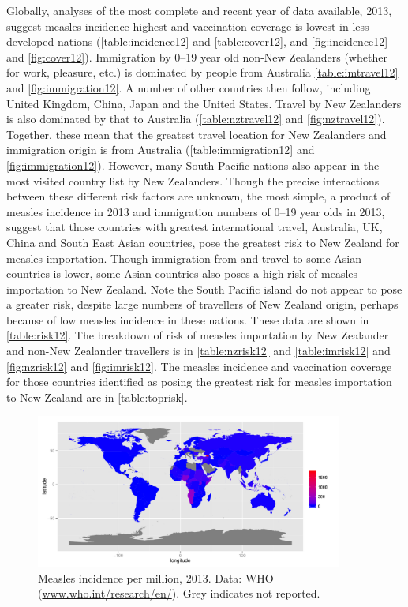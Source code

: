 \documentclass{article}
\begin{document}
Globally, analyses of the most complete and recent year of data available, 2013, suggest measles incidence highest  and vaccination coverage is lowest in less developed nations (\autoref{table:incidence12} and \autoref{table:cover12}, and \autoref{fig:incidence12} and \autoref{fig:cover12}). Immigration by 0--19 year old non-New Zealanders (whether for work, pleasure, etc.) is dominated by people from Australia \autoref{table:imtravel12} and \autoref{fig:immigration12}. A number of other countries then follow, including United Kingdom, China, Japan and the United States. Travel by New Zealanders is also dominated by that to Australia (\autoref{table:nztravel12} and \autoref{fig:nztravel12}). Together, these mean that the greatest travel location for New Zealanders and immigration origin is from Australia (\autoref{table:immigration12} and \autoref{fig:immigration12}). However, many South Pacific nations also appear in the most visited country list by New Zealanders. Though the precise interactions between these different risk factors are unknown, the most simple, a product of measles incidence in 2013 and immigration numbers of 0--19 year olds in 2013, suggest that those countries with greatest international travel, Australia, UK, China and South East Asian countries, pose the greatest risk to New Zealand for measles importation. Though immigration from and travel to some Asian countries is lower, some Asian countries also poses a high risk of measles importation to New Zealand. Note the South Pacific island do not appear to pose a greater risk, despite large numbers of travellers of New Zealand origin, perhaps because of low measles incidence in these nations. These data are shown in \autoref{table:risk12}. The breakdown of risk of measles importation by New Zealander and non-New Zealander travellers is in \autoref{table:nzrisk12} and \autoref{table:imrisk12} and \autoref{fig:nzrisk12} and \autoref{fig:imrisk12}. The measles incidence and vaccination coverage for those countries identified as posing the greatest risk for measles importation to New Zealand are in \autoref{table:toprisk}. 

\begin{figure}
\begin{center}
     \includegraphics[width=0.9\textwidth]{2013totnp2.pdf}
\end{center}
\caption{Measles incidence per million, 2013. Data: WHO (\href{http://www.who.int/research/en/}{www.who.int/research/en/}). Grey indicates not reported.}
\label{fig:incidence12}
\end{figure}
\end{document}
